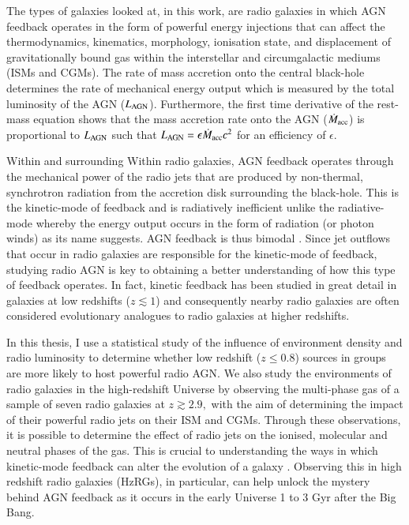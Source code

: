 The types of galaxies looked at, in this work, are radio galaxies in which AGN feedback operates in the form of powerful energy injections that can affect the thermodynamics, kinematics, morphology, ionisation state, and displacement of gravitationally bound gas within the interstellar and circumgalactic mediums (ISMs and CGMs). The rate of mass accretion onto the central black-hole determines the rate of mechanical energy output which is measured by the total luminosity of the AGN ($L_{\rm AGN}$). Furthermore, the first time derivative of the rest-mass equation shows that the mass accretion rate onto the AGN ($\dot{M}_{\rm acc}$) is proportional to $L_{\rm AGN}$ such that $L_{\rm AGN} = \epsilon \dot{M}_{\rm acc} c^2$ for an efficiency of $\epsilon.$

Within and surrounding Within radio galaxies, AGN feedback operates through the mechanical power of the radio jets that are produced by non-thermal, synchrotron radiation from the accretion disk surrounding the black-hole. This is the kinetic-mode of feedback and is radiatively inefficient unlike the radiative-mode whereby the energy output occurs in the form of radiation (or photon winds) as its name suggests. AGN feedback is thus bimodal \citep{heckman2014}. Since jet outflows that occur in radio galaxies are responsible for the kinetic-mode of feedback, studying radio AGN is key to obtaining a better understanding of how this type of feedback operates. In fact, kinetic feedback has been studied in great detail in galaxies at low redshifts ($z \lesssim 1$) and consequently nearby radio galaxies are often considered evolutionary analogues to radio galaxies at higher redshifts. 

In this thesis, I use a statistical study of the influence of environment density and radio luminosity to determine whether low redshift ($z \leq 0.8$) sources in groups are more likely to host powerful radio AGN. We also study the environments of radio galaxies in the high-redshift Universe by observing the multi-phase gas of a sample of seven radio galaxies at $z \gtrsim 2.9,$ with the aim of determining the impact of their powerful radio jets on their ISM and CGMs. Through these observations, it is possible to determine the effect of radio jets on the ionised, molecular and neutral phases of the gas. This is crucial to understanding the ways in which kinetic-mode feedback can alter the evolution of a galaxy \citep{Fabian2012}. Observing this in high redshift radio galaxies (HzRGs), in particular, can help unlock the mystery behind AGN feedback as it occurs in the early Universe 1 to 3 Gyr after the Big Bang. 

